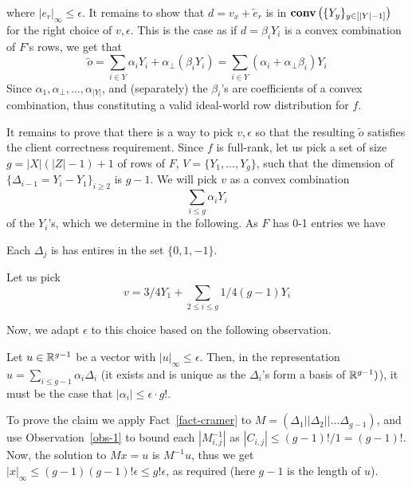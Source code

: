 \documentclass{llncs}
\newcommand{\CH}[1]{\normalfont{\mathbf{conv}\of{#1}}}
\begin{document}
where $|e_r|_\infty\leq \epsilon$.
It remains to show that $d = v_x + \tilde{e}_r$ is in $\CH{\{Y_y\}_{y\in [|Y|-1]}}$ for the right choice of $v,\epsilon$. This is the case as if $d = \beta_i Y_i$ is a convex combination of $F$'s rows, we get that
\[\tilde{o} = \sum_{i\in Y}\alpha_i Y_i + \alpha_\bot (\beta_i Y_i)=\sum_{i\in Y}(\alpha_i +\alpha_\bot\beta_i)Y_i\]
Since $\alpha_1,\alpha_\bot,\ldots,\alpha_{|Y|}$, and (separately) the $\beta_i$'s are coefficients of a convex combination, thus constituting a valid ideal-world row distribution for $f$.


It remains to prove that there is a way to pick $v,\epsilon$ 
so that the resulting $\tilde{o}$ satisfies the client correctness requirement.
Since $f$ is full-rank, let us pick  a set of size $g=|X|(|Z|-1)+1$ of rows of $F$, $V = \{Y_1,\ldots,Y_g\}$, such that the dimension of $\{\Delta_{i-1} = Y_i - Y_1\}_{i\geq 2}$ is $g-1$. We will pick $v$ as a convex combination
\[\sum_{i\leq g}\alpha_iY_i\]
of the $Y_i$'s, which we determine in the following.
As $F$ has 0-1 entries we have 
\begin{observation}\label{obs-1}
Each $\Delta_j$ is has entires in the set $\{0,1,-1\}$.
\end{observation}
Let us pick
\[v = 3/4Y_1 + \sum_{2\leq i\leq g}1/4(g-1) Y_i\]

Now, we adapt $\epsilon$ to this choice based on the following observation.
\begin{claim}\label{clm-proj}
Let $u\in {\mathbb R}^{g-1}$ be a vector with $|u|_\infty \leq \epsilon$. 
Then, in the representation $u = \sum_{i\leq g-1}\alpha_i\Delta_i$
(it exists and is unique as the $\Delta_i$'s form a basis of ${\mathbb R}^{g-1})$),
it must be the case that $|\alpha_i|\leq \epsilon \cdot g!$.  
\end{claim}

To prove the claim we apply Fact~\ref{fact-cramer} to $M=(\Delta_1||\Delta_2||\ldots \Delta_{g-1})$, and use Observation~\ref{obs-1} to bound each $|{M}^{-1}_{i,j}|$ as $|C_{i,j}|\leq (g-1)!/1=(g-1)!$. Now, the solution to $Mx=u$ is $M^{-1}u$, thus we get $|x|_\infty\leq (g-1)(g-1)!\epsilon\leq g!\epsilon$, as required (here $g-1$ is the length of $u$).
\end{document}
